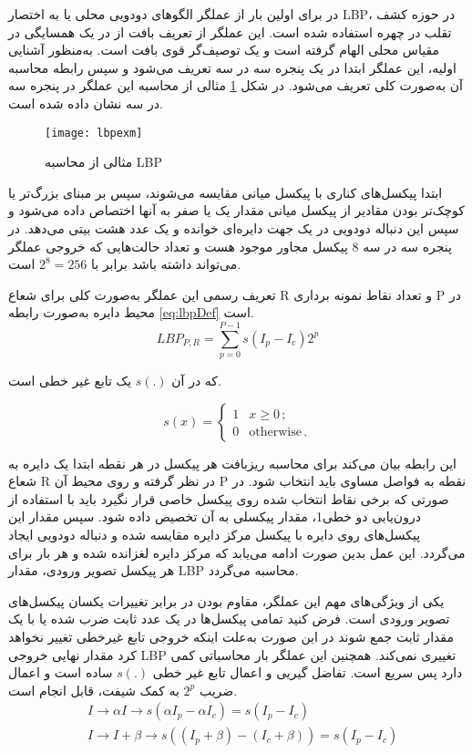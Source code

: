 در 
\cite{maatta2011face}
برای اولین بار از عملگر الگوهای دودویی محلی یا به اختصار LBP، در حوزه کشف تقلب در چهره استفاده شده است. این عملگر از تعریف بافت از در یک همسایگی در مقیاس محلی الهام گرفته است و یک توصیف‌گر قوی بافت است. به‌منظور آشنایی اولیه، این عملگر ابتدا در یک پنجره سه در سه تعریف می‌شود و سپس رابطه محاسبه آن به‌صورت کلی تعریف می‌شود. در شکل 
\ref{fig:lbpexm}
مثالی از محاسبه این عملگر در پنجره سه در سه نشان داده شده است.
\begin{figure}[ht]
	\centerline{\texttt{[image: lbpexm]}}
	\caption{مثالی از محاسبه LBP }
	\label{fig:lbpexm}
\end{figure}
ابتدا پیکسل‌های کناری با پیکسل میانی مقایسه می‌شوند، سپس بر مبنای بزرگ‌تر یا کوچک‌تر بودن مقادیر از پیکسل میانی مقدار یک یا صفر به آنها اختصاص داده می‌شود و سپس این دنباله دودویی در یک جهت دایره‌ای خوانده و یک عدد هشت بیتی می‌دهد. در پنجره سه در سه 8 پیکسل مجاور موجود هست و تعداد حالت‌هایی که خروجی عملگر می‌تواند داشته باشد برابر با
$2^8=256$
است.





تعریف رسمی این عملگر به‌صورت کلی برای شعاع R و تعداد نقاط نمونه برداری P در محیط دایره به‌صورت رابطه
\ref{eq:lbpDef}
است.
\begin{equation}\label{eq:lbpDef}
			LBP_{P,R}=\sum_{p=0}^{P-1}s(I_p-I_c)2^p 
\end{equation}

که در آن
$s(.)$
یک تابع غیر خطی است.

\[ s(x) = 
\begin{cases} 1  & \text{$x \geq 0 $}\,; \\
	0  & \text{otherwise}\,.
\end{cases} \]

این رابطه بیان می‌کند برای محاسبه ریزبافت هر پیکسل در هر نقطه ابتدا یک دایره به شعاع R در نظر گرفته و روی محیط آن P نقطه به فواصل مساوی باید انتخاب شود. در صورتی که برخی نقاط انتخاب شده روی پیکسل خاصی قرار نگیرد باید با استفاده از درون‌یابی دو خطی1، مقدار پیکسلی به آن تخصیص داده شود. سپس مقدار این پیکسل‌های روی دایره با پیکسل مرکز دایره مقایسه شده و دنباله دودویی ایجاد می‌گردد. این عمل بدین صورت ادامه می‌یابد که مرکز دایره لغزانده شده و هر بار برای هر پیکسل تصویر ورودی، مقدار LBP محاسبه می‌گردد.

یکی از ویژگی‌های مهم این عملگر، مقاوم بودن در برابر تغییرات یکسان پیکسل‌های تصویر ورودی است. فرض کنید تمامی پیکسل‌ها در یک عدد ثابت ضرب شده یا با یک مقدار ثابت جمع شوند در این صورت به‌علت اینکه خروجی تابع غیرخطی تغییر نخواهد کرد مقدار نهایی خروجی LBP تغییری نمی‌کند.
همچنین این عملگر بار محاسباتی کمی دارد پس سریع است. تفاضل گیریی و اعمال تابع غیر خطی   
$s(.)$
ساده است و اعمال ضریب
$2^p$
به کمک شیفت، قابل انجام است.
\begin{align}\label{eq:lbpfeature}
	&I \to \alpha I \to s(\alpha I_p -\alpha I_c) = s(I_p - I_c) \\
	&I \to I+\beta \to s((I_p + \beta)-(I_c + \beta)) = s(I_p - I_c ) 
\end{align}


